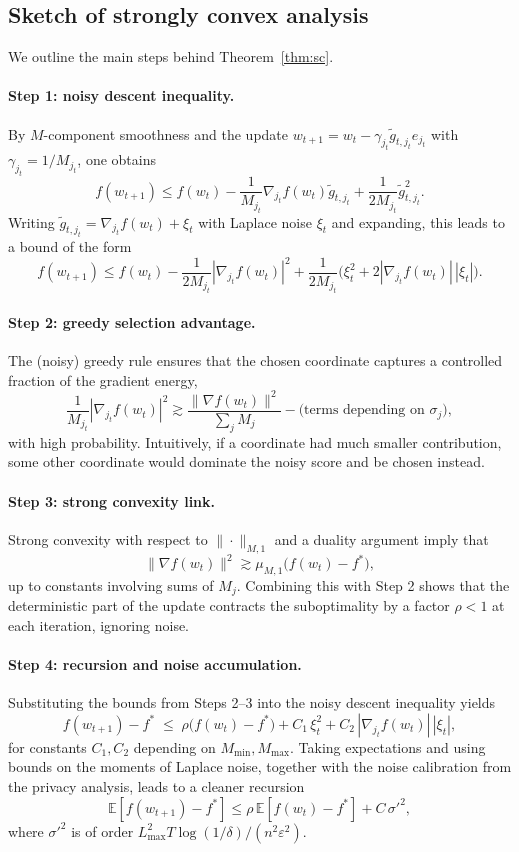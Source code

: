 \documentclass[11pt,a4paper]{article}
\begin{document}
\subsection{Sketch of strongly convex analysis}

We outline the main steps behind Theorem~\ref{thm:sc}.

\paragraph{Step 1: noisy descent inequality.}
By \(M\)-component smoothness and the update \(w_{t+1} = w_t - \gamma_{j_t} \tilde g_{t,j_t} e_{j_t}\) with \(\gamma_{j_t} = 1/M_{j_t}\), one obtains
\[
  f(w_{t+1}) \le f(w_t)
    - \frac{1}{M_{j_t}} \nabla_{j_t} f(w_t) \tilde g_{t,j_t}
    + \frac{1}{2M_{j_t}} \tilde g_{t,j_t}^2.
\]
Writing \(\tilde g_{t,j_t} = \nabla_{j_t} f(w_t) + \xi_t\) with Laplace noise \(\xi_t\) and expanding, this leads to a bound of the form
\[
  f(w_{t+1}) \le f(w_t)
    - \frac{1}{2M_{j_t}} |\nabla_{j_t} f(w_t)|^2
    + \frac{1}{2M_{j_t}}\bigl(\xi_t^2 + 2|\nabla_{j_t} f(w_t)|\,|\xi_t|\bigr).
\]

\paragraph{Step 2: greedy selection advantage.}
The (noisy) greedy rule ensures that the chosen coordinate captures a controlled fraction of the gradient energy,
\[
  \frac{1}{M_{j_t}} |\nabla_{j_t} f(w_t)|^2
  \gtrsim \frac{\|\nabla f(w_t)\|^2}{\sum_{j} M_j}
    - \text{(terms depending on }\sigma_j\text{)},
\]
with high probability. Intuitively, if a coordinate had much smaller contribution, some other coordinate would dominate the noisy score and be chosen instead.

\paragraph{Step 3: strong convexity link.}
Strong convexity with respect to \(\|\cdot\|_{M,1}\) and a duality argument imply that
\[
  \|\nabla f(w_t)\|^2 \gtrsim \mu_{M,1} \bigl(f(w_t) - f^*\bigr),
\]
up to constants involving sums of \(M_j\). Combining this with Step 2 shows that the deterministic part of the update contracts the suboptimality by a factor \(\rho < 1\) at each iteration, ignoring noise.

\paragraph{Step 4: recursion and noise accumulation.}
Substituting the bounds from Steps 2--3 into the noisy descent inequality yields
\[
  f(w_{t+1}) - f^* \;\le\; \rho \bigl(f(w_t) - f^*\bigr)
    + C_1\,\xi_t^2 + C_2\,|\nabla_{j_t} f(w_t)|\,|\xi_t|,
\]
for constants \(C_1,C_2\) depending on \(M_{\min},M_{\max}\). Taking expectations and using bounds on the moments of Laplace noise, together with the noise calibration from the privacy analysis, leads to a cleaner recursion
\[
  \mathbb{E}[f(w_{t+1}) - f^*]
  \le \rho\,\mathbb{E}[f(w_t) - f^*]
    + C\,\sigma'^2,
\]
where \(\sigma'^2\) is of order \(L_{\max}^2 T \log(1/\delta)/(n^2\varepsilon^2)\).
\end{document}
